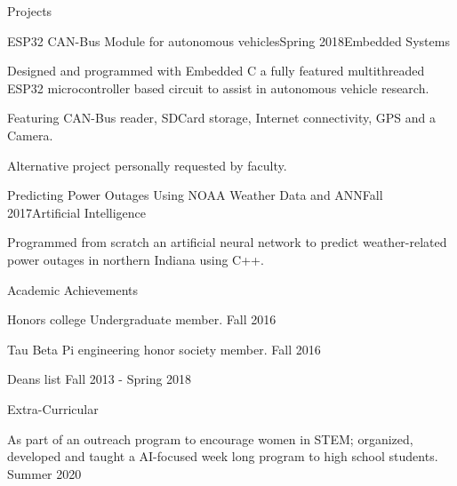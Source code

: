 \documentclass{resume}
\begin{document}
\begin{rSection}{Projects}
\begin{rSubsection}{ESP32 CAN-Bus Module for autonomous vehicles}{Spring 2018}{{Embedded Systems}}{}
    \item Designed and programmed with Embedded C a fully featured multithreaded ESP32 microcontroller based circuit to assist in autonomous vehicle research.
    \item Featuring CAN-Bus reader, SDCard storage, Internet connectivity, GPS and a Camera.
    \item Alternative project personally requested by faculty.
\end{rSubsection}


\begin{rSubsection}{Predicting Power Outages Using NOAA Weather Data and ANN}{Fall 2017}{{Artificial Intelligence}}{}
    \item Programmed from scratch an artificial neural network to predict weather-related power outages in northern Indiana using C++.
\end{rSubsection}

\end{rSection}
% 
\begin{rSection}{Academic Achievements} 
    \item Honors college Undergraduate member. \hfill Fall 2016
    \item Tau Beta Pi engineering honor society member. \hfill Fall 2016
    \item Deans list \hfill Fall 2013 - Spring 2018
\end{rSection}

\begin{rSection}{Extra-Curricular} 
    \item As part of an outreach program to encourage women in STEM; organized, developed and taught a AI-focused week long program to high school students. \hfill Summer 2020
\end{rSection}
\end{document}
